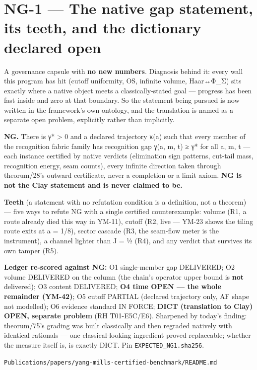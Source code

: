 \hypertarget{ng-1-the-native-gap-statement-its-teeth-and-the-dictionary-declared-open}{%
\section{NG-1 --- The native gap statement, its teeth, and the dictionary declared open}\label{ng-1-the-native-gap-statement-its-teeth-and-the-dictionary-declared-open}}

A governance capsule with \textbf{no new numbers}. Diagnosis behind it: every wall this program has hit (cutoff uniformity, OS, infinite volume, Haar↔Φ\_Σ) sits exactly where a native object meets a classically-stated goal --- progress has been fast inside and zero at that boundary. So the statement being pursued is now written in the framework's own ontology, and the translation is named as a separate open problem, explicitly rather than implicitly.

\textbf{NG.} There is γ* \textgreater{} 0 and a declared trajectory κ(a) such that every member of the recognition fabric family has recognition gap γ(a, m, t) ≥ γ* for all a, m, t --- each instance certified by native verdicts (elimination sign patterns, cut-tail mass, recognition energy, seam counts), every infinite direction taken through theorum/28's outward certificate, never a completion or a limit axiom. \textbf{NG is not the Clay statement and is never claimed to be.}

\textbf{Teeth} (a statement with no refutation condition is a definition, not a theorem) --- five ways to refute NG with a single certified counterexample: volume (R1, a route already died this way in YM-11), cutoff (R2, live --- YM-23 shows the tiling route exits at a = 1/8), sector cascade (R3, the seam-flow meter is the instrument), a channel lighter than J = ½ (R4), and any verdict that survives its own tamper (R5).

\textbf{Ledger re-scored against NG:} O1 single-member gap DELIVERED; O2 volume DELIVERED on the column (the chain's operator upper bound is \textbf{not} delivered); O3 content DELIVERED; \textbf{O4 time OPEN --- the whole remainder (YM-42)}; O5 cutoff PARTIAL (declared trajectory only, AF shape not modelled); O6 evidence standard IN FORCE; \textbf{DICT (translation to Clay) OPEN, separate problem} (RH T01-E5C/E6). Sharpened by today's finding: theorum/75's grading was built classically and then regraded natively with identical rationals --- one classical-looking ingredient proved replaceable; whether the measure itself is, is exactly DICT. Pin \texttt{EXPECTED\_NG1.sha256}.

\begin{flushright}\small\texttt{Publications/papers/yang-mills-certified-benchmark/README.md}\end{flushright}
